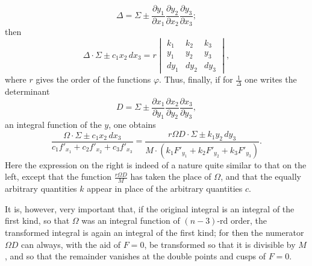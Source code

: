 \documentclass[10pt]{article}
\begin{document}
\[
\Delta=\Sigma\pm
\frac{\partial y_1}{\partial x_1}
\frac{\partial y_2}{\partial x_2}
\frac{\partial y_3}{\partial x_3};
\]
then
\[
\Delta\cdot\Sigma\pm c_1x_2\,dx_3
=r\begin{vmatrix}
k_1&k_2&k_3\\
y_1&y_2&y_3\\
dy_1&dy_2&dy_3
\end{vmatrix},
\]
where \(r\) gives the order of the functions \(\varphi\). Thus, finally, if for \(\frac1\Delta\) one writes the determinant
\[
D=\Sigma\pm
\frac{\partial x_1}{\partial y_1}
\frac{\partial x_2}{\partial y_2}
\frac{\partial x_3}{\partial y_3},
\]
an integral function of the \(y\), one obtains
\[
\frac{\Omega\cdot\Sigma\pm c_1x_2\,dx_3}
 {c_1f'_{x_1}+c_2f'_{x_2}+c_3f'_{x_3}}
=
\frac{r\Omega D\cdot\Sigma\pm k_1y_2\,dy_3}
 {M\cdot (k_1F'_{y_1}+k_2F'_{y_2}+k_3F'_{y_3})}.
\]
Here the expression on the right is indeed of a nature quite similar to that on the left, except that the function \(\frac{r\Omega D}{M}\) has taken the place of \(\Omega\), and that the equally arbitrary quantities \(k\) appear in place of the arbitrary quantities \(c\).

It is, however, very important that, if the original integral is an integral of the first kind, so that \(\Omega\) was an integral function of \((n-3)\)-rd order, the transformed integral is again an integral of the first kind; for then the numerator \(\Omega D\) can always, with the aid of \(F=0\), be transformed so that it is divisible by \(M\), and so that the remainder vanishes at the double points and cusps of \(F=0\).
\end{document}
